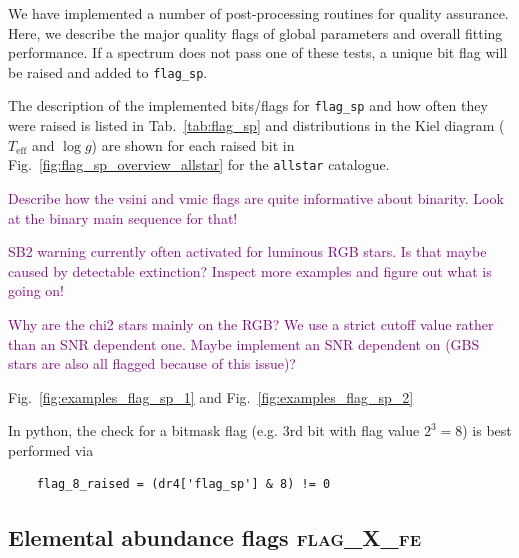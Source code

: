 \documentclass[
  journal=pasa,
  manuscript=research-paper, %
  year=2024,
  volume=37
]{cup-journal}
\newcommand{\SB}[1]{{\textcolor{purple}{#1}}}
\newcommand{\Teff}{$T_\mathrm{eff}$\xspace}
\newcommand{\logg}{$\log g$\xspace}
\begin{document}
We have implemented a number of post-processing routines for quality assurance. Here, we describe the major quality flags of global parameters and overall fitting performance. If a spectrum does not pass one of these tests, a unique bit flag will be raised and added to \texttt{flag\_sp}.



The description of the implemented bits/flags for \texttt{flag\_sp} and how often they were raised is listed in Tab.~\ref{tab:flag_sp} and distributions in the Kiel diagram (\Teff and \logg) are shown for each raised bit in Fig.~\ref{fig:flag_sp_overview_allstar} for the \texttt{allstar} catalogue.

\SB{Describe how the vsini and vmic flags are quite informative about binarity. Look at the binary main sequence for that!}

\SB{SB2 warning currently often activated for luminous RGB stars. Is that maybe caused by detectable extinction? Inspect more examples and figure out what is going on!}

\SB{Why are the chi2 stars mainly on the RGB? We use a strict cutoff value rather than an SNR dependent one. Maybe implement an SNR dependent on (GBS stars are also all flagged because of this issue)?}

Fig.~\ref{fig:examples_flag_sp_1} and Fig.~\ref{fig:examples_flag_sp_2}

In python, the check for a bitmask flag (e.g. 3rd bit with flag value $2^3 = 8$) is best performed via 
\begin{verbatim}
    flag_8_raised = (dr4['flag_sp'] & 8) != 0
\end{verbatim}






\subsection{Elemental abundance flags \textsc{flag\_X\_fe}}
\label{sec:flag_x_fe}
\end{document}
